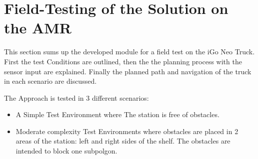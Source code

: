 \begin{table}[H]
    \centering
    \caption{Comparison of Fitness Values of the optimum paths generated by Different Algorithms in Simple and Complex Environments}
    \label{tab:fitness_values}    
\end{table}

\section{Field-Testing of the Solution on the AMR}
This section sums up the developed module for a field test on the iGo Neo Truck. 
First the test Conditions are outlined, then the the planning process with the sensor input are explained.
Finally the planned path and navigation of the truck in each scenario are discussed.

The Approach is tested in 3 different scenarios:
\begin{itemize}
    \item A Simple Test Environment where The station is free of obstacles.
    \item Moderate complexity Test Environments where  obstacles are placed in 2 areas of the station:
    left and right sides of the shelf. The obstacles are intended to block one subpolgon.
\end{itemize}

